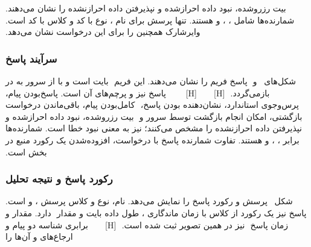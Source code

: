 ‫بیت رزروشده،  نبود داده احرازشده و  نپذیرفتن داده احرازنشده را نشان
‫می‌دهند. شمارنده‌ها شامل
‫، ،  و 
‫هستند. تنها پرسش برای نام ، نوع  با کد  و کلاس 
‫با کد  است. وایرشارک همچنین  را برای این درخواست نشان
‫می‌دهد.
‫
‫\subsubsection{سرآیند پاسخ}
‫
‫شکل‌های~ و
‫ پاسخ فریم  را نشان می‌دهند. این فریم
‫ بایت است و با  از  سرور به  در  بازمی‌گردد.
‫
‫[H]
‫
‫
‫
‫
‫
‫[H]
‫
‫
‫
‫
‫
‫ پاسخ نیز  و پرچم‌های آن  است.  پاسخ‌بودن
‫پیام،  پرس‌وجوی استاندارد،  نشان‌دهنده  بودن پاسخ،
‫ کامل‌بودن پیام،  باقی‌ماندن درخواست
‫بازگشتی،  امکان انجام بازگشت توسط سرور و
‫ بیت رزروشده،  نبود داده احرازشده و  نپذیرفتن داده احرازنشده
‫را مشخص می‌کنند؛  نیز به معنی نبود خطا است. شمارنده‌ها برابر ،
‫،  و  هستند. تفاوت شمارنده
‫پاسخ با درخواست، افزوده‌شدن یک رکورد منبع در بخش  است.
‫
‫\subsubsection{رکورد پاسخ و نتیجه تحلیل}
‫
‫شکل~ پرسش و رکورد پاسخ را نمایش می‌دهد. نام، نوع و کلاس پرسش
‫،  و  است. پاسخ نیز یک رکورد  از کلاس  با
‫زمان ماندگاری ، طول داده  بایت و مقدار
‫ دارد. مقدار  و زمان پاسخ
‫ نیز در همین تصویر ثبت شده است.
‫
‫[H]
‫
‫
‫
‫
‫
‫برابری شناسه  دو پیام و ارجاع‌های  و  آن‌ها را
